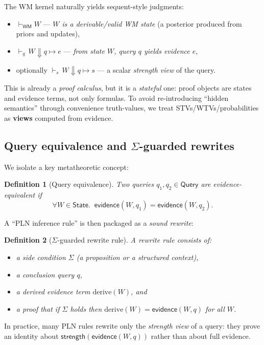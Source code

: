\documentclass[11pt]{article}
\newtheorem{definition}{Definition}
\newcommand{\State}{\mathsf{State}}
\newcommand{\Query}{\mathsf{Query}}
\newcommand{\WM}{\mathsf{WM}}
\newcommand{\Strength}{\mathsf{strength}}
\newcommand{\ev}{\mathsf{evidence}}
\newcommand{\side}{\Sigma}
\begin{document}
The WM kernel naturally yields sequent-style judgments:

\begin{itemize}[leftmargin=2em]
\item $\vdash_{\WM} W$ --- \emph{$W$ is a derivable/valid WM state} (a posterior produced from priors and updates),
\item $\vdash_q\, W \Downarrow q \mapsto e$ --- \emph{from state $W$, query $q$ yields evidence $e$},
\item optionally $\vdash_s\, W \Downarrow q \mapsto s$ --- a scalar \emph{strength view} of the query.
\end{itemize}

This is already a \emph{proof calculus}, but it is a \emph{stateful} one:
proof objects are states and evidence terms, not only formulas.
To avoid re-introducing ``hidden semantics'' through convenience truth-values,
we treat STVs/WTVs/probabilities as \textbf{views} computed from evidence.

\subsection{Query equivalence and $\Sigma$-guarded rewrites}

We isolate a key metatheoretic concept:

\begin{definition}[Query equivalence]
Two queries $q_1,q_2\in\Query$ are \emph{evidence-equivalent} if
\[
  \forall W\in\State.\;\; \ev(W,q_1)=\ev(W,q_2).
\]
\end{definition}

A ``PLN inference rule'' is then packaged as a \emph{sound rewrite}:

\begin{definition}[$\Sigma$-guarded rewrite rule]
A rewrite rule consists of:
\begin{itemize}[leftmargin=2em]
\item a side condition $\side$ (a proposition or a structured context),
\item a conclusion query $q$,
\item a derived evidence term $\mathrm{derive}(W)$, and
\item a proof that if $\side$ holds then $\mathrm{derive}(W)=\ev(W,q)$ for all $W$.
\end{itemize}
\end{definition}

In practice, many PLN rules rewrite only the \emph{strength view} of a query:
they prove an identity about $\Strength(\ev(W,q))$ rather than about full evidence.
\end{document}
